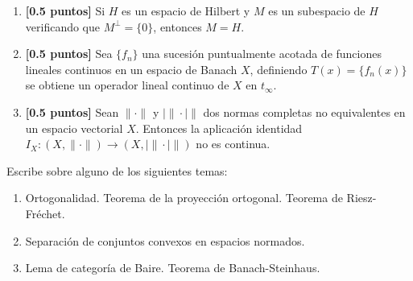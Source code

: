 \documentclass[12pt]{article}
\begin{document}
\begin{ejercicio}[2 puntos]
\begin{enumerate}[label=\alph*)]

            \item \textbf{[0.5 puntos]} Si $H$ es un espacio de Hilbert y $M$ es un subespacio de $H$ verificando que $M^\perp = \{0\}$, entonces $M = H$.
            \item \textbf{[0.5 puntos]} Sea $\{f_n\}$ una sucesión puntualmente acotada de funciones lineales continuos en un espacio de Banach $X$, definiendo $T(x) = \{f_n(x)\}$ se obtiene un operador lineal continuo de $X$ en $t_\infty$.
            \item \textbf{[0.5 puntos]} Sean $\|\cdot \|$ y $|\|\cdot |\|$ dos normas completas no equivalentes en un espacio vectorial $X$. Entonces la aplicación identidad $I_X:(X,\|\cdot \|)\to (X,|\|\cdot |\|)$ no es continua.
        \end{enumerate}
    \end{ejercicio}

    \begin{ejercicio}[3 puntos]
        Escribe sobre alguno de los siguientes temas:
        \begin{enumerate}[label=\alph*)]
            \item Ortogonalidad. Teorema de la proyección ortogonal. Teorema de Riesz-Fréchet.
            \item Separación de conjuntos convexos en espacios normados.
            \item Lema de categoría de Baire. Teorema de Banach-Steinhaus.
        \end{enumerate}
    \end{ejercicio}
\end{document}
